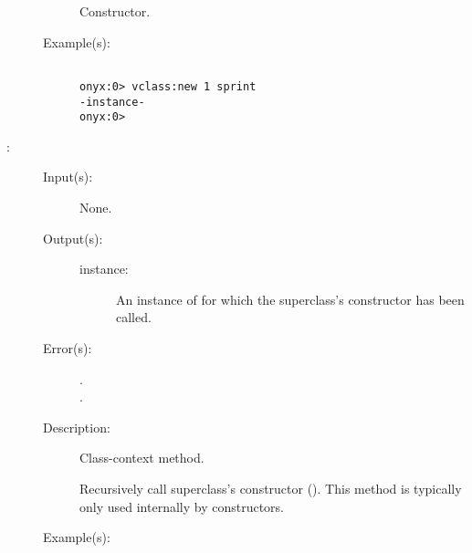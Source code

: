 \begin{description}
\begin{description}
		Constructor.
	\item[Example(s): ]\begin{verbatim}

onyx:0> vclass:new 1 sprint
-instance-
onyx:0>
		\end{verbatim}
	\end{description}
\label{vclass:rnew}
\item[{\onyxop{--}{rnew}{instance}}: ]
	\begin{description}\item[]
	\item[Input(s): ] None.
	\item[Output(s): ]
		\begin{description}\item[]
		\item[instance: ]
			An instance of  for which the superclass's
			constructor has been called.
		\end{description}
	\item[Error(s): ]
		\begin{description}\item[]
		\item[.]
		\item[.]
		\end{description}
	\item[Description: ]
		Class-context method.

		Recursively call superclass's constructor ().
		This method is typically only used internally by constructors.
	\item[Example(s): ]\begin{verbatim}


\end{verbatim}
\end{description}
\end{description}
